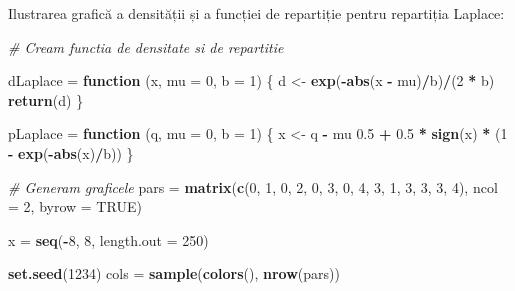 \documentclass[]{article}
\newenvironment{Shaded}{\begin{snugshade}}{\end{snugshade}}
\newcommand{\KeywordTok}[1]{\textcolor[rgb]{0.13,0.29,0.53}{\textbf{#1}}}
\newcommand{\DataTypeTok}[1]{\textcolor[rgb]{0.13,0.29,0.53}{#1}}
\newcommand{\DecValTok}[1]{\textcolor[rgb]{0.00,0.00,0.81}{#1}}
\newcommand{\FloatTok}[1]{\textcolor[rgb]{0.00,0.00,0.81}{#1}}
\newcommand{\StringTok}[1]{\textcolor[rgb]{0.31,0.60,0.02}{#1}}
\newcommand{\CommentTok}[1]{\textcolor[rgb]{0.56,0.35,0.01}{\textit{#1}}}
\newcommand{\OtherTok}[1]{\textcolor[rgb]{0.56,0.35,0.01}{#1}}
\newcommand{\ControlFlowTok}[1]{\textcolor[rgb]{0.13,0.29,0.53}{\textbf{#1}}}
\newcommand{\OperatorTok}[1]{\textcolor[rgb]{0.81,0.36,0.00}{\textbf{#1}}}
\newcommand{\NormalTok}[1]{#1}
\begin{document}
Ilustrarea grafică a densității și a funcției de repartiție pentru
repartiția Laplace:

\begin{Shaded}
\begin{Highlighting}[]
\CommentTok{# Cream functia de densitate si de repartitie }

\NormalTok{dLaplace =}\StringTok{ }\ControlFlowTok{function}\NormalTok{ (x, }\DataTypeTok{mu =} \DecValTok{0}\NormalTok{, }\DataTypeTok{b =} \DecValTok{1}\NormalTok{) }
\NormalTok{\{}
\NormalTok{    d <-}\StringTok{ }\KeywordTok{exp}\NormalTok{(}\OperatorTok{-}\KeywordTok{abs}\NormalTok{(x }\OperatorTok{-}\StringTok{ }\NormalTok{mu)}\OperatorTok{/}\NormalTok{b)}\OperatorTok{/}\NormalTok{(}\DecValTok{2} \OperatorTok{*}\StringTok{ }\NormalTok{b)}
    \KeywordTok{return}\NormalTok{(d)}
\NormalTok{\}}

\NormalTok{pLaplace =}\StringTok{ }\ControlFlowTok{function}\NormalTok{ (q, }\DataTypeTok{mu =} \DecValTok{0}\NormalTok{, }\DataTypeTok{b =} \DecValTok{1}\NormalTok{) }
\NormalTok{\{}
\NormalTok{    x <-}\StringTok{ }\NormalTok{q }\OperatorTok{-}\StringTok{ }\NormalTok{mu}
    \FloatTok{0.5} \OperatorTok{+}\StringTok{ }\FloatTok{0.5} \OperatorTok{*}\StringTok{ }\KeywordTok{sign}\NormalTok{(x) }\OperatorTok{*}\StringTok{ }\NormalTok{(}\DecValTok{1} \OperatorTok{-}\StringTok{ }\KeywordTok{exp}\NormalTok{(}\OperatorTok{-}\KeywordTok{abs}\NormalTok{(x)}\OperatorTok{/}\NormalTok{b))}
\NormalTok{\}}

\CommentTok{# Generam graficele }
\NormalTok{pars =}\StringTok{ }\KeywordTok{matrix}\NormalTok{(}\KeywordTok{c}\NormalTok{(}\DecValTok{0}\NormalTok{, }\DecValTok{1}\NormalTok{, }\DecValTok{0}\NormalTok{, }\DecValTok{2}\NormalTok{, }\DecValTok{0}\NormalTok{, }\DecValTok{3}\NormalTok{, }\DecValTok{0}\NormalTok{, }\DecValTok{4}\NormalTok{, }\DecValTok{3}\NormalTok{, }\DecValTok{1}\NormalTok{, }\DecValTok{3}\NormalTok{, }\DecValTok{3}\NormalTok{, }\DecValTok{3}\NormalTok{, }\DecValTok{4}\NormalTok{), }
              \DataTypeTok{ncol =} \DecValTok{2}\NormalTok{, }\DataTypeTok{byrow =} \OtherTok{TRUE}\NormalTok{)}

\NormalTok{x =}\StringTok{ }\KeywordTok{seq}\NormalTok{(}\OperatorTok{-}\DecValTok{8}\NormalTok{, }\DecValTok{8}\NormalTok{, }\DataTypeTok{length.out =} \DecValTok{250}\NormalTok{)}

\KeywordTok{set.seed}\NormalTok{(}\DecValTok{1234}\NormalTok{)}
\NormalTok{cols =}\StringTok{ }\KeywordTok{sample}\NormalTok{(}\KeywordTok{colors}\NormalTok{(), }\KeywordTok{nrow}\NormalTok{(pars))}


\end{Highlighting}
\end{Shaded}
\end{document}
